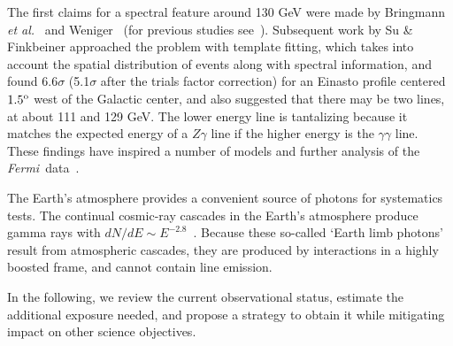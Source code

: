 \documentclass[aps,prd,superscriptaddress,nofootinbib,fixlfloat, 12pt]{revtex4-1}
\newcommand{\Fermi}{{\slshape Fermi}}
\newcommand{\degree}{^{\rm o}}
\begin{document}
The first claims for a spectral feature around 130 GeV were made by Bringmann
\textit{et al.}~\citep{Bringmann:2012} and Weniger~\citep{Weniger:2012} (for
previous studies see~\cite{Pullen:2006sy, Abdo:2010nc, Vertongen:2011mu,
Ackermann:2012qk}). Subsequent work by Su \& Finkbeiner approached the problem
with template fitting, which takes into account the spatial distribution of
events along with spectral information, and found 6.6$\sigma$ (5.1$\sigma$
after the trials factor correction) for an Einasto profile centered
$1.5\degree$ west of the Galactic center, and also suggested that there may
be two lines, at about 111 and 129 GeV. The lower energy line is
tantalizing because it matches the expected energy of a $Z\gamma$ line if
the higher energy is the $\gamma\gamma$ line.  
These findings have inspired a number of models and
further analysis of the \Fermi\ data~\citep{Dudas:2012, Choi:2012,
Kyae:2012, Lee:2012, Rajaraman:2012, Acharya:2012, Garny:2012,
Buckley:2012, Chu:2012, Kang:2012, Buchmuller:2012, Bergstrom:2012b,
Heo:2012, Park:2012, Tulin:2012, Cline:2012, Weiner:2012, WeinerYavin:2012b,
FanReece:2012, Huang:2012, Whiteson:2012, Buchmuller:2012, Cholis:2012}.
 
The Earth's atmosphere provides a convenient source of
photons for systematics tests.  The continual cosmic-ray
cascades in the Earth's atmosphere produce gamma rays with
$dN/dE \sim E^{-2.8}$~\citep{FermiLimb}.  Because these
so-called `Earth limb photons' result from atmospheric
cascades, they are produced by interactions in a highly
boosted frame, and cannot contain line emission.

In the following, we review the current observational status, estimate the
additional exposure needed, and propose a strategy to obtain it while
mitigating impact on other science objectives. 
\end{document}
